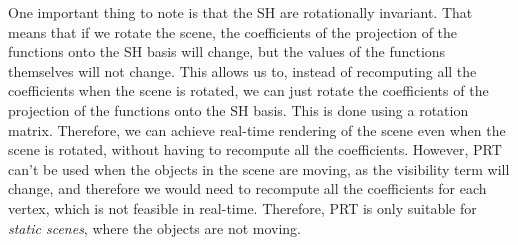 One important thing to note is that the SH are rotationally invariant. That means that if we rotate the scene, the coefficients of the projection of the functions onto the SH basis will change, but the values of the functions themselves will not change. This allows us to, instead of recomputing all the coefficients when the scene is rotated, we can just rotate the coefficients of the projection of the functions onto the SH basis. This is done using a rotation matrix. Therefore, we can achieve real-time rendering of the scene even when the scene is rotated, without having to recompute all the coefficients. However, PRT can't be used when the objects in the scene are moving, as the visibility term will change, and therefore we would need to recompute all the coefficients for each vertex, which is not feasible in real-time. Therefore, PRT is only suitable for \emph{static scenes}, where the objects are not moving.